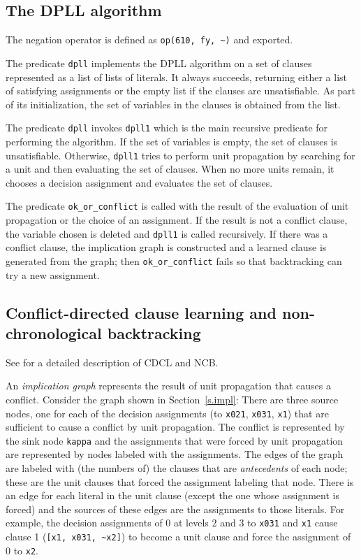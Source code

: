 \documentclass[11pt]{article}
\newcommand*{\p}[1]{\textup{\texttt{#1}}}
\begin{document}
\subsection{The DPLL algorithm}

The negation operator is defined as \verb+op(610, fy, ~)+ and exported.

The predicate \p{dpll} implements the DPLL algorithm on a set of clauses
represented as a list of lists of literals. It always succeeds,
returning either a list of satisfying assignments or the empty list if
the clauses are unsatisfiable. As part of its initialization, the set of
variables in the clauses is obtained from the list. 

The predicate \p{dpll} invokes \p{dpll1} which is the main recursive
predicate for performing the algorithm. If the set of variables is
empty, the set of clauses is unsatisfiable. Otherwise, \p{dpll1} tries
to perform unit propagation by searching for a unit and then evaluating
the set of clauses. When no more units remain, it chooses a decision
assignment and evaluates the set of clauses.

The predicate \p{ok\_or\_conflict} is called with the result of the
evaluation of unit propagation or the choice of an assignment. If the
result is not a conflict clause, the variable chosen is deleted and
\p{dpll1} is called recursively. If there was a conflict clause, the
implication graph is constructed and a learned clause is generated from
the graph; then \p{ok\_or\_conflict} fails so that backtracking can try
a new assignment.

\subsection{Conflict-directed clause learning and non-chronological backtracking}

See \cite{mlm} for a detailed description of CDCL and NCB.

An \emph{implication graph} represents the result of unit propagation
that causes a conflict. Consider the graph shown in
Section~\ref{s.impl}: There are three source nodes, one for each of the
decision assignments (to \p{x021}, \p{x031}, \p{x1}) that are sufficient
to cause a conflict by unit propagation. The conflict is represented by
the sink node \p{kappa} and the assignments that were forced by unit
propagation are represented by nodes labeled with the assignments. The
edges of the graph are labeled with (the numbers of) the clauses that
are \emph{antecedents} of each node; these are the unit clauses that
forced the assignment labeling that node. There is an edge for each
literal in the unit clause (except the one whose assignment is forced)
and the sources of these edges are the assignments to those literals.
For example, the decision assignments of 0 at levels 2 and 3 to \p{x031}
and \p{x1} cause clause 1 (\verb+[x1, x031, ~x2]+) to become a unit
clause and force the assignment of 0 to \p{x2}.
\end{document}
